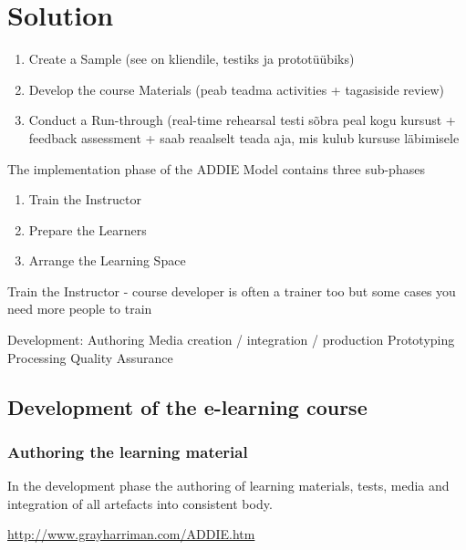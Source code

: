 \chapter{Solution}
\label{solution}



\begin{enumerate}
\item Create a Sample (see on kliendile, testiks ja prototüübiks)
\item Develop the course Materials (peab teadma activities + tagasiside review)
\item Conduct a Run-through (real-time rehearsal testi sõbra peal kogu kursust +  feedback assessment + saab reaalselt teada aja, mis kulub kursuse läbimisele
\end{enumerate}


The implementation phase of the ADDIE Model contains three sub-phases

\begin{enumerate}
\item Train the Instructor
\item Prepare the Learners
\item Arrange the Learning Space
\end{enumerate}

Train the Instructor - course developer is often a trainer too but some cases you need more people to train


Development:
Authoring
Media creation / integration / production
Prototyping
Processing
Quality Assurance

\section{Development of the e-learning course}

\subsection{Authoring the learning material}
In the development phase the authoring of learning materials, tests, media and integration of all artefacts into consistent body. 

\url{http://www.grayharriman.com/ADDIE.htm}

